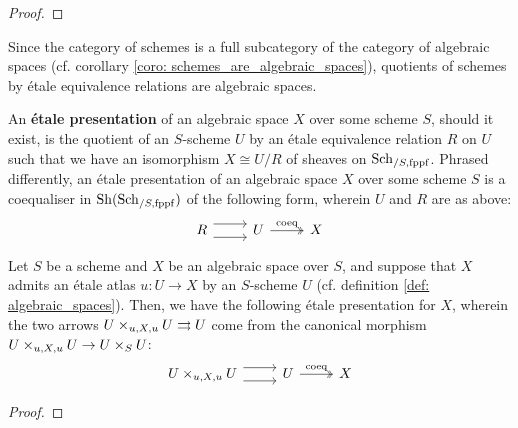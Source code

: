                 \begin{proof}
                    
                \end{proof}
            \begin{corollary} \label{prop: quotients_of_schemes_by_etale_equivalence_relations_are_algebraic_spaces}
                Since the category of schemes is a full subcategory of the category of algebraic spaces (cf. corollary \ref{coro: schemes_are_algebraic_spaces}), quotients of schemes by \'etale equivalence relations are algebraic spaces.
            \end{corollary}
            \begin{definition} \label{def: etale_presentations_of_algebraic_spaces}
                An \textbf{\'etale presentation} of an algebraic space $X$ over some scheme $S$, should it exist, is the quotient of an $S$-scheme $U$ by an \'etale equivalence relation $R$ on $U$ such that we have an isomorphism $X \cong U/R$ of sheaves on $\mathrm{Sch}_{/S, \mathrm{fppf}}$. Phrased differently, an \'etale presentation of an algebraic space $X$ over some scheme $S$ is a coequaliser in $\mathrm{Sh}(\mathrm{Sch}_{/S, \mathrm{fppf}})$ of the following form, wherein $U$ and $R$ are as above:
                    $$
                        \begin{tikzcd}
                        	R & U & X
                        	\arrow[shift right=2, from=1-1, to=1-2]
                        	\arrow[shift left=2, from=1-1, to=1-2]
                        	\arrow["\coeq", two heads, from=1-2, to=1-3]
                        \end{tikzcd}
                    $$
            \end{definition}
            \begin{lemma} \label{lemma: existence_of_etale_presentations_of_algebraic_spaces}
                Let $S$ be a scheme and $X$ be an algebraic space over $S$, and suppose that $X$ admits an \'etale atlas $u: U \to X$ by an $S$-scheme $U$ (cf. definition \ref{def: algebraic_spaces}). Then, we have the following \'etale presentation for $X$, wherein the two arrows $U \x_{u, X, u} U \toto U$ come from the canonical morphism $U \x_{u, X, u} U \to U \x_S U$:
                    $$
                        \begin{tikzcd}
                        	{U \x_{u, X, u} U} & U & X
                        	\arrow[shift right=2, from=1-1, to=1-2]
                        	\arrow[shift left=2, from=1-1, to=1-2]
                        	\arrow["\coeq", two heads, from=1-2, to=1-3]
                        \end{tikzcd}
                    $$
            \end{lemma}
                \begin{proof}
                    
                \end{proof}
    
